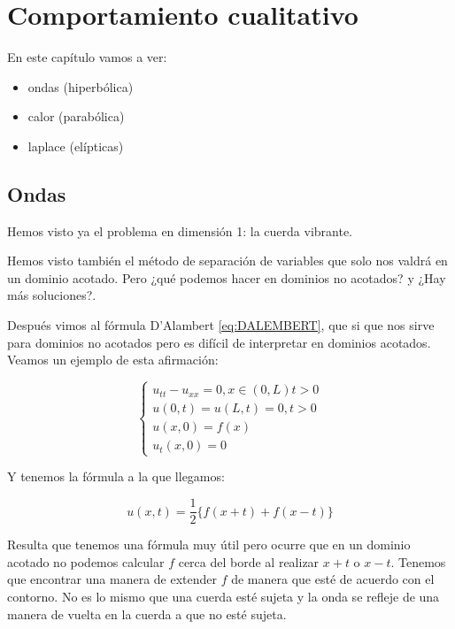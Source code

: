 \chapter{Comportamiento cualitativo}


En este capítulo vamos a ver:

\begin{itemize}

	\item ondas (hiperbólica)
	\item calor (parabólica)
	\item laplace (elípticas)

\end{itemize}


\section{Ondas}

	Hemos visto ya el problema en dimensión 1: la cuerda vibrante.

	Hemos visto también el método de separación de variables que solo nos valdrá en un dominio acotado. Pero ¿qué podemos hacer en dominios no acotados? y ¿Hay más soluciones?.

	Después vimos al fórmula D'Alambert \ref{eq:DALEMBERT}, que si que nos sirve para dominios no acotados pero es difícil de interpretar en dominios acotados. Veamos un ejemplo de esta afirmación:

	\begin{example}

		\[\begin{cases}
			u_{tt} - u_{xx} = 0, x \in (0,L) t > 0 \\
			u(0,t) = u(L,t) = 0, t > 0\\
			u(x,0) = f(x) \\
			u_t(x,0) = 0
		\end{cases}\]

		Y tenemos la fórmula a la que llegamos:

		\[ u(x,t) = \frac{1}{2} \{f(x+t)+f(x-t)\}  \]

		Resulta que tenemos una fórmula muy útil pero ocurre que en un dominio acotado no podemos calcular $f$ cerca del borde al realizar $x+t$ o $x-t$. Tenemos que encontrar una manera de extender $f$ de manera que esté de acuerdo con el contorno. No es lo mismo que una cuerda esté sujeta y la onda se refleje de una manera de vuelta en la cuerda a que no esté sujeta.

		\begin{center}
		\end{center}

	\end{example}


